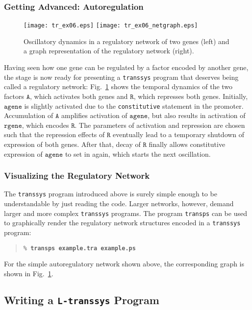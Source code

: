 \documentclass[12pt]{article}
\newcommand{\transsys}{\texttt{transsys}}
\newcommand{\ltranssys}{\texttt{L-}\transsys}
\newcommand{\codeword}[1]{\texttt{#1}}
\newcommand{\factorsym}[1]{\ensuremath{\mathtt{#1}}}
\newcommand{\genesym}[1]{\ensuremath{\mathtt{#1}}}
\newcommand{\prgname}[1]{\texttt{#1}}
\newcommand{\cmdline}[2][\% ]{\texttt{#1\textbf{#2}}}
\begin{document}
\subsubsection{Getting Advanced: Autoregulation}
\label{sect_cycler_final}

\begin{figure}
\centerline{
  \texttt{[image: tr\_ex06.eps]}
  \texttt{[image: tr\_ex06\_netgraph.eps]}
}
\caption{\label{fig_cycler}
  Oscillatory dynamics in a regulatory network of two genes (left) and
  a graph representation of the regulatory network (right).
}
\end{figure}

Having seen how one gene can be regulated by a factor encoded by
another gene, the stage is now ready for presenting a \transsys{}
program that deserves being called a regulatory network:
Fig.\ \ref{fig_cycler} shows the temporal dynamics of the two factors
\factorsym{A}, which activates both genes and \factorsym{R}, which
represses both genes. Initially, \genesym{agene} is slightly activated
due to the \codeword{constitutive} statement in the
promoter. Accumulation of \factorsym{A} amplifies activation of
\genesym{agene}, but also results in activation of \genesym{rgene},
which encodes \factorsym{R}. The parameters of activation and
repression are chosen such that the repression effects of
\factorsym{R} eventually lead to a temporary shutdown of expression of
both genes. After that, decay of \factorsym{R} finally allows
constitutive expression of \genesym{agene} to set in again, which
starts the next oscillation.


\subsubsection{Visualizing the Regulatory Network}

The \transsys{} program introduced above is surely simple enough to be
understandable by just reading the code. Larger networks, however,
demand larger and more complex \transsys{} programs. The program
\prgname{transps} can be used to graphically render the regulatory
network structures encoded in a \transsys{} program:
\begin{quote}
\cmdline{transps example.tra example.ps}
\end{quote}
For the simple autoregulatory network shown above, the corresponding
graph is shown in Fig.\ \ref{fig_cycler}.


\subsection{Writing a \ltranssys{} Program}
\end{document}
